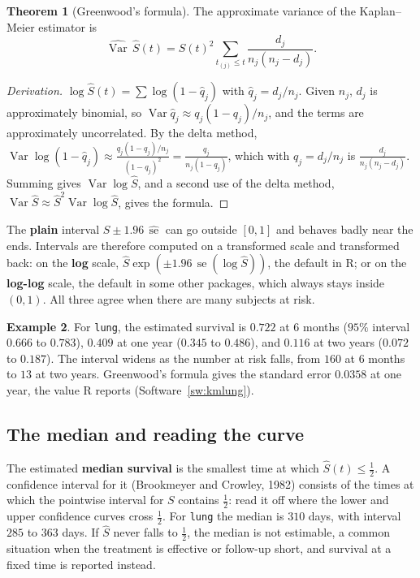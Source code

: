 \documentclass[11pt,a4paper]{article}
\numberwithin{equation}{section}
\theoremstyle{definition}
\newtheorem{thm}{Theorem}[subsection]
\newtheorem{exa}[thm]{Example}
\begin{document}
\begin{thm}[Greenwood's formula]
\label{thm:greenwood}
The approximate variance of the Kaplan--Meier estimator is
\[
\widehat{\operatorname{Var}}\,\hat S(t) = \hat S(t)^2\sum_{t_{(j)} \leq t}\frac{d_j}{n_j(n_j - d_j)} .
\]
\end{thm}

\begin{proof}[Derivation]
$\log\hat S(t) = \sum\log(1 - \hat q_j)$ with $\hat q_j = d_j/n_j$. Given $n_j$, $d_j$ is approximately binomial, so $\operatorname{Var}\hat q_j \approx q_j(1 - q_j)/n_j$, and the terms are approximately uncorrelated. By the delta method, $\operatorname{Var}\log(1 - \hat q_j) \approx \frac{q_j(1 - q_j)/n_j}{(1 - q_j)^2} = \frac{q_j}{n_j(1 - q_j)}$, which with
$q_j = d_j/n_j$ is $\frac{d_j}{n_j(n_j - d_j)}$. Summing gives $\operatorname{Var}\log\hat S$, and a second use of the delta method, $\operatorname{Var}\hat S \approx \hat S^2\operatorname{Var}\log\hat S$, gives the formula.
\end{proof}

The \textbf{plain} interval $\hat S \pm 1.96\,\widehat{\operatorname{se}}$ can go outside $[0, 1]$ and behaves badly near the ends. Intervals are therefore computed on a transformed scale and transformed back: on the \textbf{log} scale, $\hat S\exp(\pm1.96\,\operatorname{se}(\log\hat S))$, the default in R; or on the \textbf{log-log} scale, the default in some other
packages, which always stays inside $(0, 1)$. All three agree when there are many subjects at risk.

\begin{exa}
\label{ex:kmlung}
For \texttt{lung}, the estimated survival is $0.722$ at $6$ months ($95\%$ interval $0.666$ to $0.783$), $0.409$ at one year ($0.345$ to $0.486$), and $0.116$ at two years ($0.072$ to $0.187$). The interval widens as the number at risk falls, from $160$ at $6$ months to $13$ at two years. Greenwood's formula gives the standard error $0.0358$ at one
year, the value R reports (Software~\ref{sw:kmlung}).
\end{exa}

\subsection{The median and reading the curve}
\label{ssec:median}

The estimated \textbf{median survival} is the smallest time at which $\hat S(t) \leq \frac12$. A confidence interval for it (Brookmeyer and Crowley, 1982) consists of the times at which the pointwise interval for $S$ contains $\frac12$: read it off where the lower and upper confidence curves cross $\frac12$. For \texttt{lung} the median is $310$ days, with interval
$285$ to $363$ days. If $\hat S$ never falls to $\frac12$, the median is not estimable, a common situation when the treatment is effective or follow-up short, and survival at a fixed time is reported instead.
\end{document}
